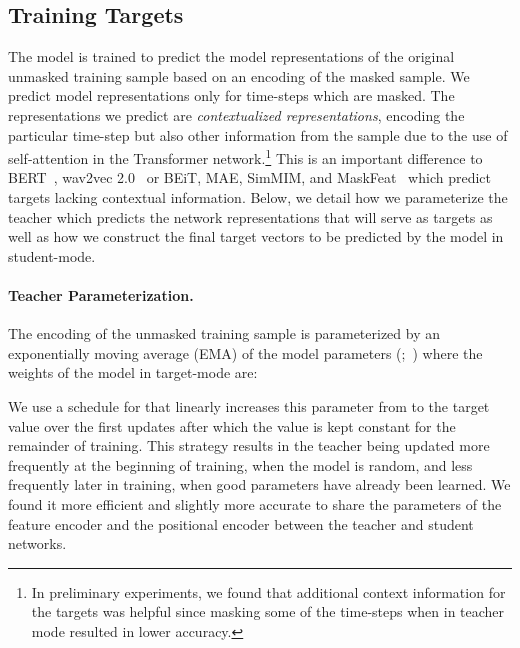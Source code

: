 \documentclass[nohyperref]{article}
\theoremstyle{plain}
\theoremstyle{definition}
\theoremstyle{remark}
\begin{document}
\subsection{Training Targets}
\label{sec:method_targets}

The model is trained to predict the model representations of the original unmasked training sample based on an encoding of the masked sample.
We predict model representations only for time-steps which are masked.
The representations we predict are \emph{contextualized representations}, encoding the particular time-step but also other information from the sample due to the use of self-attention in the Transformer network.\footnote{
In preliminary experiments, we found that additional context information for the targets was helpful since masking some of the time-steps when in teacher mode resulted in lower accuracy.
}
This is an important difference to BERT~\citep{devlin2018bert}, wav2vec 2.0~\citep{baevski2020wav} or BEiT, MAE, SimMIM, and MaskFeat~\citep{bao2021beit,he2021mae,xie2021simmim,wei2021masked} which predict targets lacking contextual information.
Below, we detail how we parameterize the teacher which predicts the network representations that will serve as targets as well as how we construct the final target vectors to be predicted by the model in student-mode.

\paragraph{Teacher Parameterization.}
The encoding of the unmasked training sample is parameterized by an exponentially moving average (EMA) of the model parameters (;~\citealt{tarvainen2018mean,grill2020byol,caron2021dino}) where the weights of the model in target-mode  are:


We use a schedule for  that linearly increases this parameter  from  to the target value  over the first  updates after which the value is kept constant for the remainder of training.
This strategy results in the teacher being updated more frequently at the beginning of training, when the model is random, and less frequently later in training, when good parameters have already been learned. 
We found it more efficient and slightly more accurate to share the parameters of the feature encoder and the positional encoder between the teacher and student networks.
\end{document}
